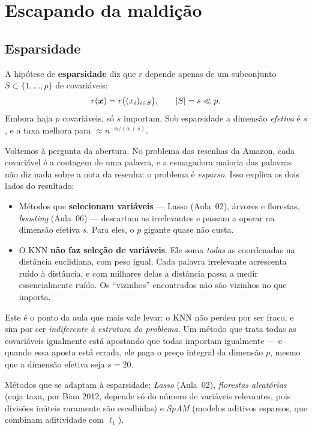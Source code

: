 \documentclass[11pt,a4paper]{article}
\begin{document}
\section{Escapando da maldição}
\subsection{Esparsidade}\label{sec:esparsidade}
A hipótese de \textbf{esparsidade} diz que $r$ depende apenas de um subconjunto
$S\subset\{1,\dots,p\}$ de covariáveis:
\[
  r(\bm{x}) = r\big((x_i)_{i\in S}\big),\qquad \left\lvert S \right\rvert=s \ll p.
\]
Embora haja $p$ covariáveis, só $s$ importam. Sob esparsidade a dimensão
\emph{efetiva} é $s$, e a taxa melhora para $\approx n^{-\alpha/(\alpha+s)}$.

Voltemos à pergunta da abertura. No problema das resenhas da Amazon, cada covariável
é a contagem de uma palavra, e a esmagadora maioria das palavras não diz nada sobre a
nota da resenha: o problema é \emph{esparso}. Isso explica os dois lados do
resultado:

\begin{itemize}[leftmargin=1.4cm]
  \item Métodos que \textbf{selecionam variáveis} --- Lasso (Aula~02), árvores e
        florestas, \emph{boosting} (Aula~06) --- descartam as irrelevantes e passam
        a operar na dimensão efetiva $s$. Para eles, o $p$ gigante quase não custa.
  \item O KNN \textbf{não faz seleção de variáveis}. Ele soma \emph{todas} as
        coordenadas na distância euclidiana, com peso igual. Cada palavra
        irrelevante acrescenta ruído à distância, e com milhares delas a distância
        passa a medir essencialmente ruído. Os ``vizinhos'' encontrados não são
        vizinhos no que importa.
\end{itemize}

\begin{ideia}
Este é o ponto da aula que mais vale levar: o KNN não perdeu por ser fraco, e sim
por ser \emph{indiferente à estrutura do problema}. Um método que trata todas as
covariáveis igualmente está apostando que todas importam igualmente --- e quando
essa aposta está errada, ele paga o preço integral da dimensão $p$, mesmo que a
dimensão efetiva seja $s=20$.
\end{ideia}

\begin{observacao}
Métodos que se adaptam à esparsidade: \emph{Lasso} (Aula~02), \emph{florestas
aleatórias} (cuja taxa, por Biau 2012, depende só do número de variáveis
relevantes, pois divisões inúteis raramente são escolhidas) e \emph{SpAM}
(modelos aditivos esparsos, que combinam aditividade com $\ell_1$).
\end{observacao}
\end{document}

